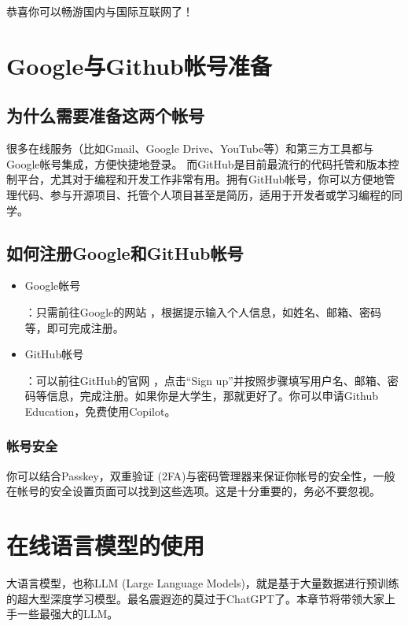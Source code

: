 恭喜你可以畅游国内与国际互联网了！

\section{\textsf{Google}与\textsf{Github}帐号准备}
\subsection{为什么需要准备这两个帐号}
很多在线服务（比如\textsf{Gmail}、\textsf{Google Drive}、\textsf{YouTube}等）和第三方工具都与\textsf{Google}帐号集成，方便快捷地登录。
而\textsf{GitHub}是目前最流行的代码托管和版本控制平台，尤其对于编程和开发工作非常有用。拥有\textsf{GitHub}帐号，你可以方便地管理代码、参与开源项目、托管个人项目甚至是简历，适用于开发者或学习编程的同学。
\subsection{如何注册\textsf{Google}和\textsf{GitHub}帐号}

\begin{itemize}
    \item \hypertarget{google}{\textsf{Google}帐号}：只需前往\textsf{Google}的网站 \href{https://accounts.google.com}{\color{black}\faLink}，根据提示输入个人信息，如姓名、邮箱、密码等，即可完成注册。
    \item \hypertarget{github}{\textsf{GitHub}帐号}：可以前往\textsf{GitHub}的官网 \href{https://github.com}{\color{black}\faLink}，点击“Sign up”并按照步骤填写用户名、邮箱、密码等信息，完成注册。如果你是大学生，那就更好了。你可以申请\textsf{Github Education}，免费使用\textsf{Copilot}。
\end{itemize}

\subsubsection*{帐号安全}
你可以结合\textsf{Passkey}，双重验证 (\textsf{2FA})与密码管理器来保证你帐号的安全性，一般在帐号的安全设置页面可以找到这些选项。这是十分重要的，务必不要忽视。

\section{在线语言模型的使用}

大语言模型，也称LLM (Large Language Models)，就是基于大量数据进行预训练的超大型深度学习模型。最名震遐迩的莫过于\textsf{ChatGPT}了。本章节将带领大家上手一些最强大的LLM。

